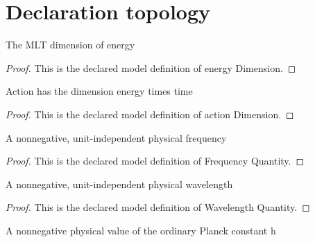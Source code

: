 \section{Declaration topology}
\begin{definition}
  \label{def:physics:phyx-mini-0577:phyxminiproblems-problemphyxmini0577-energydimension}
  The MLT dimension of energy
\end{definition}
\begin{proof}
  This is the declared model definition of energy Dimension.
\end{proof}
\begin{definition}
  \label{def:physics:phyx-mini-0577:phyxminiproblems-problemphyxmini0577-actiondimension}
  Action has the dimension energy times time
\end{definition}
\begin{proof}
  This is the declared model definition of action Dimension.
\end{proof}
\begin{definition}
  \label{def:physics:phyx-mini-0577:phyxminiproblems-problemphyxmini0577-frequencyquantity}
  A nonnegative, unit-independent physical frequency
\end{definition}
\begin{proof}
  This is the declared model definition of Frequency Quantity.
\end{proof}
\begin{definition}
  \label{def:physics:phyx-mini-0577:phyxminiproblems-problemphyxmini0577-wavelengthquantity}
  A nonnegative, unit-independent physical wavelength
\end{definition}
\begin{proof}
  This is the declared model definition of Wavelength Quantity.
\end{proof}
\begin{definition}
  \label{def:physics:phyx-mini-0577:phyxminiproblems-problemphyxmini0577-planckconstantquantity}
  A nonnegative physical value of the ordinary Planck constant h
\end{definition}
